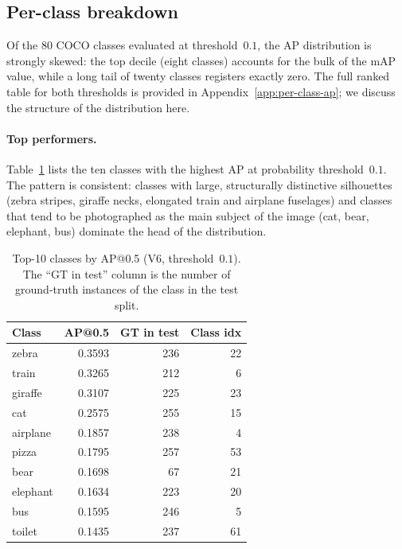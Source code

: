 \subsection{Per-class breakdown}
\label{sec:results:perclass}

Of the 80 COCO classes evaluated at threshold~$0.1$, the AP distribution is
strongly skewed: the top decile (eight classes) accounts for the bulk of the
mAP value, while a long tail of twenty classes registers exactly zero. The
full ranked table for both thresholds is provided in
Appendix~\ref{app:per-class-ap}; we discuss the structure of the distribution
here.

\paragraph{Top performers.} Table~\ref{tab:top10} lists the ten classes with
the highest AP at probability threshold~$0.1$. The pattern is consistent:
classes with large, structurally distinctive silhouettes
(zebra stripes, giraffe necks, elongated train and airplane fuselages) and
classes that tend to be photographed as the main subject of the image
(cat, bear, elephant, bus) dominate the head of the distribution.

\begin{table}[!ht]
\centering
\caption{Top-10 classes by AP@0.5 (V6, threshold~$0.1$). The ``GT in test''
column is the number of ground-truth instances of the class in the test
split.}
\label{tab:top10}
\small
\begin{tabular}{lrrr}
\toprule
\textbf{Class} & \textbf{AP@0.5} & \textbf{GT in test} & \textbf{Class idx} \\
\midrule
zebra      & 0.3593 &  236 & 22 \\
train      & 0.3265 &  212 &  6 \\
giraffe    & 0.3107 &  225 & 23 \\
cat        & 0.2575 &  255 & 15 \\
airplane   & 0.1857 &  238 &  4 \\
pizza      & 0.1795 &  257 & 53 \\
bear       & 0.1698 &   67 & 21 \\
elephant   & 0.1634 &  223 & 20 \\
bus        & 0.1595 &  246 &  5 \\
toilet     & 0.1435 &  237 & 61 \\
\bottomrule
\end{tabular}
\end{table}

